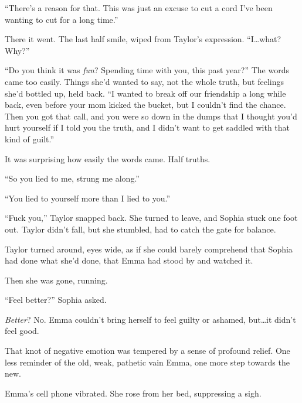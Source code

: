 ``There's a reason for that.  This was just an excuse to cut a cord I've been wanting to cut for a long time.''



There it went.  The last half smile, wiped from Taylor's expression.  ``I\ldots what?  Why?''



``Do you think it was \emph{fun}?  Spending time with you, this past year?''  The words came too easily.  Things she'd wanted to say, not the whole truth, but feelings she'd bottled up, held back.  ``I wanted to break off our friendship a long while back, even before your mom kicked the bucket, but I couldn't find the chance.  Then you got that call, and you were so down in the dumps that I thought you'd hurt yourself if I told you the truth, and I didn't want to get saddled with that kind of guilt.''



It was surprising how easily the words came.  Half truths.



``So you lied to me, strung me along.''



``You lied to yourself more than I lied to you.''



``Fuck you,'' Taylor snapped back.  She turned to leave, and Sophia stuck one foot out.  Taylor didn't fall, but she stumbled, had to catch the gate for balance.



Taylor turned around, eyes wide, as if she could barely comprehend that Sophia had done what she'd done, that Emma had stood by and watched it.



Then she was gone, running.



``Feel better?''  Sophia asked.



\emph{Better}?  No.  Emma couldn't bring herself to feel guilty or ashamed, but\ldots it didn't feel good.



That knot of negative emotion was tempered by a sense of profound relief.  One less reminder of the old, weak, pathetic vain Emma, one more step towards the new.



\blacksquare



Emma's cell phone vibrated.  She rose from her bed, suppressing a sigh.



